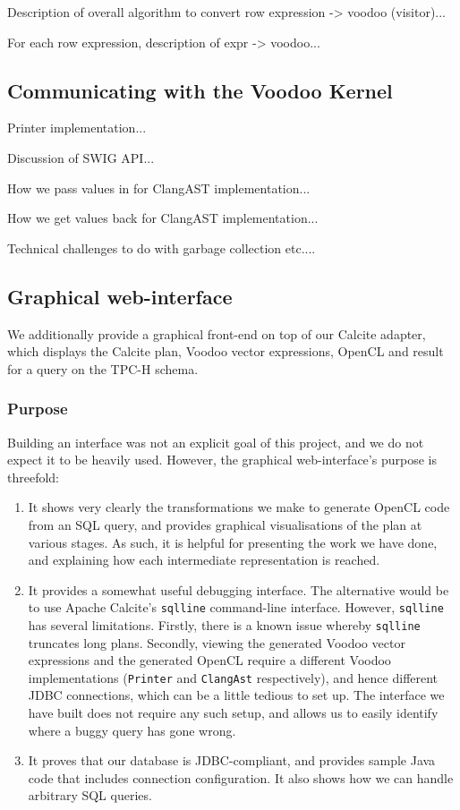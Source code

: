 Description of overall algorithm to convert row expression -> voodoo (visitor)...

For each row expression, description of expr -> voodoo...

\subsection{Communicating with the Voodoo Kernel}

Printer implementation...

Discussion of SWIG API...

How we pass values in for ClangAST implementation...

How we get values back for ClangAST implementation...

Technical challenges to do with garbage collection etc....

\subsection{Graphical web-interface}

We additionally provide a graphical front-end on top of our Calcite adapter, which displays the Calcite plan, Voodoo vector expressions, OpenCL and result for a query on the TPC-H schema.

\subsubsection{Purpose}

Building an interface was not an explicit goal of this project, and we do not expect it to be heavily used. However, the graphical web-interface's purpose is threefold:

\begin{enumerate}
\item It shows very clearly the transformations we make to generate OpenCL code from an SQL query, and provides graphical visualisations of the plan at various stages. As such, it is helpful for presenting the work we have done, and explaining how each intermediate representation is reached.
\item It provides a somewhat useful debugging interface. The alternative would be to use Apache Calcite's \texttt{sqlline} command-line interface. However, \texttt{sqlline} has several limitations. Firstly, there is a known issue whereby \texttt{sqlline} truncates long plans. Secondly, viewing the generated Voodoo vector expressions and the generated OpenCL require a different Voodoo implementations (\texttt{Printer} and \texttt{ClangAst} respectively), and hence different JDBC connections, which can be a little tedious to set up. The interface we have built does not require any such setup, and allows us to easily identify where a buggy query has gone wrong.
\item It proves that our database is JDBC-compliant, and provides sample Java code that includes connection configuration. It also shows how we can handle arbitrary SQL queries.
\end{enumerate}

